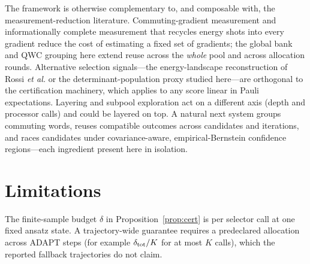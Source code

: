\documentclass[aps,pra,reprint,superscriptaddress,nofootinbib,floatfix]{revtex4-2}
\begin{document}
The framework is otherwise complementary to, and composable with, the measurement-reduction literature. Commuting-gradient measurement \cite{anastasiou2023gradients} and informationally complete measurement that recycles energy shots into every gradient \cite{nykanen2025ic} reduce the cost of estimating a fixed set of gradients; the global bank and QWC grouping here extend reuse across the \emph{whole} pool and across allocation rounds. Alternative selection signals---the energy-landscape reconstruction of Rossi \emph{et al.} \cite{rossi2026energy} or the determinant-population proxy studied here---are orthogonal to the certification machinery, which applies to any score linear in Pauli expectations. Layering and subpool exploration \cite{long2024layering} act on a different axis (depth and processor calls) and could be layered on top. A natural next system groups commuting words, reuses compatible outcomes across candidates and iterations, and races candidates under covariance-aware, empirical-Bernstein confidence regions---each ingredient present here in isolation.

\section{Limitations}
\label{sec:limitations}

The finite-sample budget $\delta$ in Proposition~\ref{prop:cert} is per selector call at one fixed ansatz state. A trajectory-wide guarantee requires a predeclared allocation across ADAPT steps (for example $\delta_{\rm tot}/K$ for at most $K$ calls), which the reported fallback trajectories do not claim.
\end{document}
